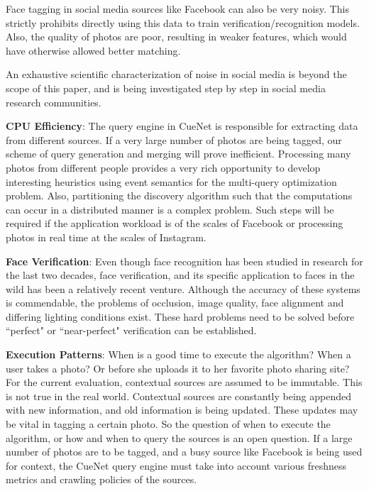 %
%

Face tagging in social media sources like Facebook can also be very noisy. This strictly prohibits directly using this data to train verification/recognition models. Also, the quality of photos are poor, resulting in weaker features, which would have otherwise allowed better matching. 

An exhaustive scientific characterization of noise in social media is beyond the scope of this paper, and is being investigated step by step in social media research communities.

\textbf{\textbf{CPU Efficiency}}: The query engine in CueNet is responsible for extracting data from different sources. If a very large number of photos are being tagged, our scheme of query generation and merging will prove inefficient. Processing many photos from different people provides a very rich opportunity to develop interesting heuristics using event semantics for the multi-query optimization problem. Also, partitioning the discovery algorithm such that the computations can occur in a distributed manner is a complex problem. Such steps will be required if the application workload is of the scales of Facebook or processing photos in real time at the scales of Instagram.

\textbf{\textbf{Face Verification}}: Even though face recognition has been studied in research for the last two decades, face verification, and its specific application to faces in the wild has been a relatively recent venture. Although the accuracy of these systems is commendable, the problems of occlusion, image quality, face alignment and differing lighting conditions exist. These hard problems need to be solved before ``perfect" or ``near-perfect" verification can be established. 

\textbf{\textbf{Execution Patterns}}: When is a good time to execute the algorithm? When a user takes a photo? Or before she uploads it to her favorite photo sharing site? For the current evaluation, contextual sources are assumed to be immutable. This is not true in the real world. Contextual sources are constantly being appended with new information, and old information is being updated. These updates may be vital in tagging a certain photo. So the question of when to execute the algorithm, or how and when to query the sources is an open question. If a large number of photos are to be tagged, and a busy source like Facebook is being used for context, the CueNet query engine must take into account various freshness metrics and crawling policies of the sources. 

